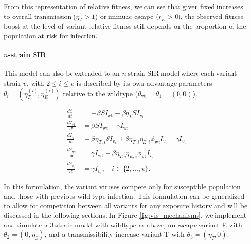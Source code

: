 \documentclass[12pt,oneside,letterpaper]{article}
\newcommand{\wt}{\text{wt}}
\def\tbc#1{\textcolor{purple}{[#1]}}
\begin{document}
From this representation of relative fitness, we can see that given fixed increases to overall transmission ($\eta_{T} > 1$) or immune escape ($\eta_{E} > 0$), the observed fitness boost at the level of variant relative fitness still depends on the proportion of the population at risk for infection.

\paragraph{$n$-strain SIR}%

This model can also be extended to an $n$-strain SIR model where each variant strain $v_i$ with $2\leq i \leq n$ is described by its own advantage parameters $\theta_{i} = (\eta_{T}^{(i)},\eta_{E}^{(i)})$  relative to the wildtype ($\theta_{\text{wt}} = \theta_{1} = (0, 0)$).

\begin{align*}
    \frac{d S}{d t} &= - \beta S I_{\wt} - \beta \eta_{T} S I_{v_{i}}\\
    \frac{d I_{\wt}}{dt} &= \beta S I_{\wt} - \gamma I_{\wt}\\
    \frac{d I_{v_{i}}}{dt} &= \beta \eta_{T, i} S I_{v_{i}} + \beta \eta_{T, i} \eta_{E, i} \phi_{\wt} I_{v_{i}} - \gamma I_{v_{i}}\\
    \frac{d \phi_{\wt}}{dt} &= \gamma I_{\wt} - \beta \eta_{T, i} \eta_{E, i} \phi_{\wt} I_{v_{i}}\\
    \frac{d \phi_{v_{i}}}{dt} &= \gamma I_{v_{i}}, \quad i \in \{2, \ldots, n\}.
\end{align*}

In this formulation, the variant viruses compete only for susceptible population and those with previous wild-type infection.
This formulation can be generalized to allow for competition between all variants for any exposure history and will be discussed in the following sections.
In Figure \ref{fig:vis_mechanisms}, we implement and simulate a 3-strain model with wildtype as above, an escape variant E with $\theta_{2} = (0, \eta_{E})$, and a transmissibility increase variant T with $\theta_{3} = (\eta_{T}, 0)$.
\end{document}
